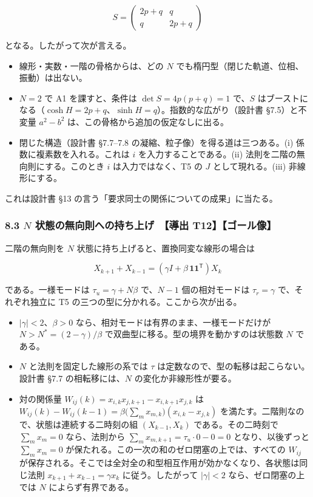 \documentclass[
  a4paper,
]{ltjsarticle}
\providecommand{\tightlist}{%
  \setlength{\itemsep}{0pt}\setlength{\parskip}{0pt}}
\begin{document}
\[
S=\begin{pmatrix}2p+q&q\\q&2p+q\end{pmatrix}
\]

となる。したがって次が言える。

\begin{itemize}
\tightlist
\item
  線形・実数・一階の骨格からは、どの \(N\)
  でも楕円型（閉じた軌道、位相、振動）は出ない。
\item
  \(N=2\) で A1 を課すと、条件は \(\det S=4p(p+q)=1\) で、\(S\)
  はブーストになる（\(\cosh H=2p+q\)、\(\sinh H=q\)）。指数的な広がり（設計書
  §7.5）と不変量 \(a^2-b^2\) は、この骨格から追加の仮定なしに出る。
\item
  閉じた構造（設計書 §7.7--7.8 の凝縮、粒子像）を得る道は三つある。(i)
  係数に複素数を入れる。これは \(i\) を入力することである。(ii)
  法則を二階の無向則にする。このとき \(i\) は入力ではなく、T5 の \(J\)
  として現れる。(iii) 非線形にする。
\end{itemize}

これは設計書 §13 の言う「要求同士の関係についての成果」に当たる。

\subsubsection{\texorpdfstring{8.3 \(N\)
状態の無向則への持ち上げ　【導出
T12】【ゴール像】}{8.3 N 状態の無向則への持ち上げ　【導出 T12】【ゴール像】}}\label{n-ux72b6ux614bux306eux7121ux5411ux5247ux3078ux306eux6301ux3061ux4e0aux3052-ux5c0eux51fa-t12ux30b4ux30fcux30ebux50cf}

二階の無向則を \(N\) 状態に持ち上げると、置換同変な線形の場合は

\[
X_{k+1}+X_{k-1}=(\gamma I+\beta\,\mathbf 1\mathbf 1^{\mathsf T})X_k
\]

である。一様モードは \(\tau_u=\gamma+N\beta\) で、\(N-1\)
個の相対モードは \(\tau_r=\gamma\) で、それぞれ独立に T5
の三つの型に分かれる。ここから次が出る。

\begin{itemize}
\tightlist
\item
  \(\lvert\gamma\rvert<2\)、\(\beta>0\)
  なら、相対モードは有界のまま、一様モードだけが
  \(N>N^{*}=(2-\gamma)/\beta\)
  で双曲型に移る。型の境界を動かすのは状態数 \(N\) である。
\item
  \(N\) と法則を固定した線形の系では \(\tau\)
  は定数なので、型の転移は起こらない。設計書 §7.7 の相転移には、\(N\)
  の変化か非線形性が要る。
\item
  対の関係量 \(W_{ij}(k)=x_{i,k}x_{j,k+1}-x_{i,k+1}x_{j,k}\) は
  \(W_{ij}(k)-W_{ij}(k-1)=\beta\bigl(\sum_mx_{m,k}\bigr)(x_{i,k}-x_{j,k})\)
  を満たす。二階則なので、状態は連続する二時刻の組 \((X_{k-1},X_k)\)
  である。その二時刻で \(\sum_mx_m=0\) なら、法則から
  \(\sum_mx_{m,k+1}=\tau_u\cdot0-0=0\) となり、以後ずっと
  \(\sum_mx_m=0\) が保たれる。この一次の和のゼロ閉塞の上では、すべての
  \(W_{ij}\)
  が保存される。そこでは全対全の和型相互作用が効かなくなり、各状態は同じ法則
  \(x_{k+1}+x_{k-1}=\gamma x_k\) に従う。したがって
  \(\lvert\gamma\rvert<2\) なら、ゼロ閉塞の上では \(N\)
  によらず有界である。
\end{itemize}
\end{document}
